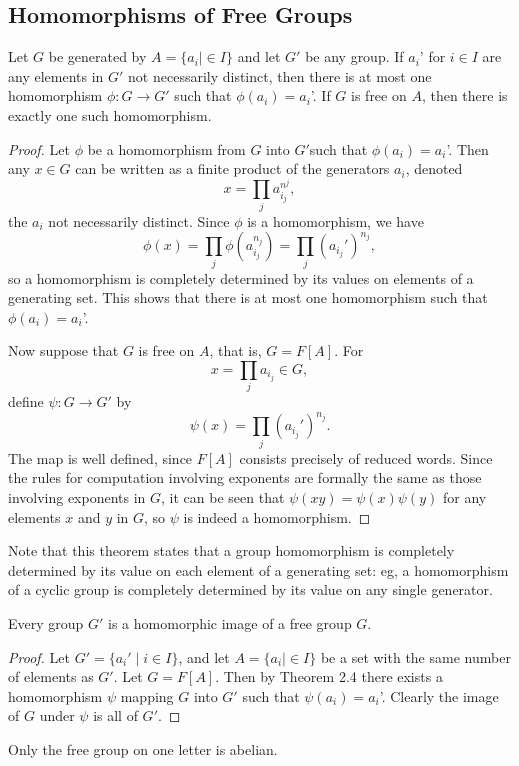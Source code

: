 \subsection{Homomorphisms of Free Groups}
\begin{theorem}
    Let $G$ be generated by $A=\{a_i \mid \in I\} $ and let $G'$ be any group. If $a_i$' for $i\in I$ are any elements in $G'$ not necessarily distinct, then there is at most one homomorphism $\phi \colon G \to G'$ such that $\phi(a_i)=a_i$'. If $G$ is free on $A$, then there is exactly one such homomorphism.
\end{theorem}
\begin{proof}
    Let $\phi$ be a homomorphism from $G$ into $G'$such that $\phi(a_i)=a_i$'. Then any $x\in G$ can be written as a finite product of the generators $a_i$, denoted \[
        x= \prod_{j} a_{i_{j}}^{n^j},
    \] the $a_i$ not necessarily distinct. Since $\phi$ is a homomorphism, we have \[
    \phi(x)=\prod_{j}\phi\left( a_{i_j}^{n_j} \right) =\prod_{j}\left( a_{i_j}' \right)^{n_j},
\] so a homomorphism is completely determined by its values on elements of a generating set. This shows that there is at most one homomorphism such that  $\phi(a_i)=a_i$'.

Now suppose that $G$ is free on $A$, that is, $G=F[A]$. For \[
x=\prod_{j} a_{i_j} \in G,
\] define $\psi \colon G \to G'$ by \[
\psi(x)=\prod_{j}\left( a_{i_j}'\right) ^{n_j}.
\] The map is well defined, since $F[A]$ consists precisely of reduced words. Since the rules for computation involving exponents are formally the same as those involving exponents in $G$, it can be seen that $\psi(xy)=\psi(x)\psi(y)$ for any elements $x$ and $y$ in $G$, so $\psi$ is indeed a homomorphism.
\end{proof}
Note that this theorem states that a group homomorphism is completely determined by its value on each element of a generating set: eg, a homomorphism of a cyclic group is completely determined by its value on any single generator.
\begin{cor}
    Every group $G'$ is a homomorphic image of a free group $G$.
\end{cor}
\begin{proof}
    Let $G'=\{a_i' \mid i\in I\} $, and let $A=\{a_i \mid \in I\} $ be a set with the same number of elements as $G'$. Let $G=F[A]$. Then by Theorem 2.4 there exists a homomorphism $\psi$ mapping $G$ into $G'$ such that $\psi(a_i)=a_i$'. Clearly the image of $G$ under $\psi$ is all of $G'$.
\end{proof}
Only the free group on one letter is abelian.
